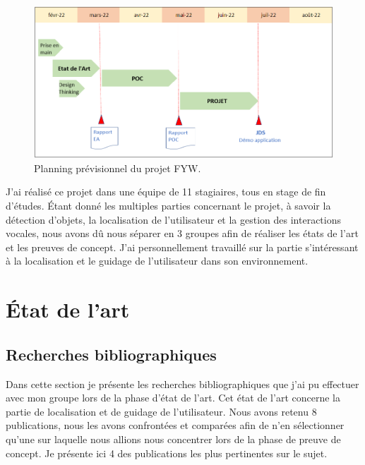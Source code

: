 \documentclass[11pt]{article}
\begin{document}
    \begin{figure}[hbt]  
      \includegraphics[width=\textwidth]{Planning.png}    
      \caption{Planning prévisionnel du projet FYW.}
      \label{fig:Planning}
    \end{figure}  
    
    J'ai réalisé ce projet dans une équipe de 11 stagiaires, tous en stage de fin d'études. Étant donné les multiples parties concernant le projet, 
    à savoir la détection d'objets, la localisation de l'utilisateur et la gestion des interactions vocales, nous avons dû nous séparer en 3 
    groupes afin de réaliser les états de l'art et les preuves de concept. J'ai personnellement travaillé sur la partie s'intéressant à la 
    localisation et le guidage de l'utilisateur dans son environnement. 
    
    \pagebreak
  
  \section{État de l'art}  

    \subsection{Recherches bibliographiques}
      Dans cette section je présente les recherches bibliographiques que j'ai pu effectuer avec mon groupe lors de la phase d'état de l'art.
      Cet état de l'art concerne la partie de localisation et de guidage de l'utilisateur. Nous avons retenu 8 publications, nous les avons 
      confrontées et comparées afin de n'en sélectionner qu'une sur laquelle nous allions nous concentrer lors de la phase de preuve de 
      concept. Je présente ici 4 des publications les plus pertinentes sur le sujet.
      
\end{document}
